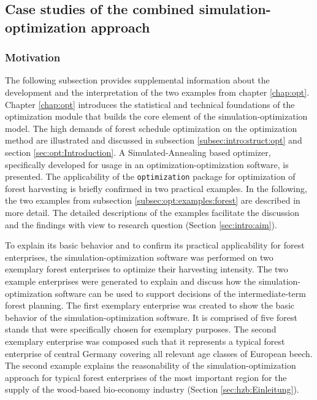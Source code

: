 \subsection{Case studies of the combined simulation-optimization approach}
\label{subsec:discussion:struct:opt:application}
\subsubsection{Motivation}
\label{subsubsec:discussion:struct:opt:application:introduction}
The following subsection provides supplemental information about the development and the interpretation of the two examples from chapter \ref{chap:opt}. Chapter \ref{chap:opt} introduces the statistical and technical foundations of the optimization module that builds the core element of the simulation-optimization model. The high demands of forest schedule optimization on the optimization method are illustrated and discussed in subsection \ref{subsec:intro:struct:opt} and section \ref{sec:opt:Introduction}. A Simulated-Annealing based optimizer, specifically developed for usage in an optimization-optimization software, is presented. The applicability of the \texttt{optimization} package for optimization of forest harvesting is briefly confirmed in two practical examples. In the following, the two examples from subsection \ref{subsec:opt:examples:forest} are described in more detail. The detailed descriptions of the examples facilitate the discussion and the findings with view to research question (Section \ref{sec:intro:aim}).

To explain its basic behavior and to confirm its practical applicability for forest enterprises, the si\-mu\-la\-tion-op\-ti\-mi\-za\-tion software was performed on two exemplary forest enterprises to optimize their harvesting intensity. The two example enterprises were generated to explain and discuss how the si\-mu\-la\-tion-op\-ti\-mi\-za\-tion software can be used to support decisions of the intermediate-term forest planning. The first exemplary enterprise was created to show the basic behavior of the si\-mu\-la\-tion-op\-ti\-mi\-za\-tion software. It is comprised of five forest stands that were specifically chosen for exemplary purposes. The second exemplary enterprise was composed such that it represents a typical forest enterprise of central Germany covering all relevant age classes of European beech. The second example explains the reasonability of the si\-mu\-la\-tion-op\-ti\-mi\-za\-tion approach for typical forest enterprises of the most important region for the supply of the wood-based bio-economy industry (Section \ref{sec:hzb:Einleitung}).

